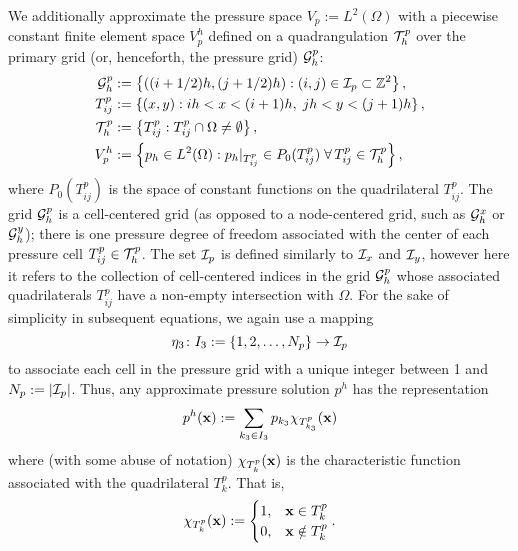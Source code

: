 We additionally approximate the pressure space $V_p := L^2(\Omega)$ with a piecewise constant finite element space $V_p^h$ defined on a quadrangulation $\mathcal{T}^p_h$ over the primary grid (or, henceforth, the pressure grid) $\mathcal{G}^p_h$:
\begin{align*}
\mathcal{G}^p_h & := \left\lbrace  ((i + 1/2)h, (j + 1/2)h) : (i,j) \in \mathcal{I}_p \subset \mathbb{Z}^2  \right\rbrace, \\
T^p_{ij} & := \left\lbrace  (x,y) : ih < x < (i+1)h, \; jh < y < (j+1)h  \right\rbrace, \\
\mathcal{T}^p_h & := \left\lbrace  T^p_{ij} : T^p_{ij} \cap \Omega \neq \emptyset  \right\rbrace, \\
V_p^h & := \left\lbrace  p_h \in L^2(\Omega) : p_h \rvert_{T^p_{ij}} \in P_0(T^p_{ij}) \; \forall \, T^p_{ij} \in \mathcal{T}^p_h  \right\rbrace,
\end{align*}
where $P_0(T^p_{ij})$ is the space of constant functions on the quadrilateral $T^p_{ij}$. The grid $\mathcal{G}^p_h$ is a cell-centered grid (as opposed to a node-centered grid, such as $\mathcal{G}^x_h$ or $\mathcal{G}^y_h$); there is one pressure degree of freedom associated with the center of each pressure cell $T^p_{ij}\in \mathcal{T}^p_h$. The set $\mathcal{I}_p$ is defined similarly to $\mathcal{I}_x$ and  $\mathcal{I}_y$, however here it refers to the collection of cell-centered indices in the grid $\mathcal{G}^p_h$ whose associated quadrilaterals $T^p_{ij}$ have a non-empty intersection with $\Omega$. For the sake of simplicity in subsequent equations, we again use a mapping
\begin{equation*}
\eta_3 \colon I_3 := \{ 1, 2, \dotsc, N_p \} \to \mathcal{I}_p
\end{equation*}
to associate each cell in the pressure grid with a unique integer between 1 and $N_p := \left\lvert \mathcal{I}_p \right\rvert$. Thus, any approximate pressure solution $p^h$ has the representation
\begin{equation} \label{eq:chap5.staggeredapproximation.p}
p^h(\mathbf{x}) := \sum_{k_3 \in I_3} p_{k_3} \chi_{T^p_{k_3}}(\mathbf{x})
\end{equation}
where (with some abuse of notation) $\chi_{T^p_k}(\mathbf{x})$ is the characteristic function associated with the quadrilateral $T^p_k$. That is,
\begin{equation*}
\chi_{T^p_k}(\mathbf{x}) := \begin{cases} 1, & \mathbf{x} \in T^p_k \\ 0, & \mathbf{x} \notin T^p_k \end{cases}.
\end{equation*}

